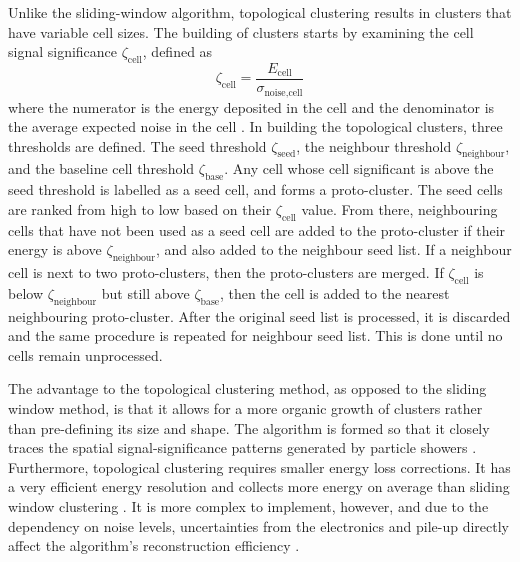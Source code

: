 Unlike the sliding-window algorithm, topological clustering results in clusters that have variable cell sizes. The building of clusters starts by examining the cell signal significance $\zeta_{\text{cell}}$, defined as
\begin{equation}
    \zeta_{\text{cell}} = \dfrac{E_{\text{cell}}}{\sigma_{\text{noise,cell}}}
\end{equation}
where the numerator is the energy deposited in the cell and the denominator is the average expected noise in the cell \cite{Aad_2017_topo_clustering}. In building the topological clusters, three thresholds are defined. The seed threshold $\zeta_{\text{seed}}$, the neighbour threshold $\zeta_{\text{neighbour}}$, and the baseline cell threshold $\zeta_{\text{base}}$. Any cell whose cell significant is above the seed threshold is labelled as a seed cell, and forms a proto-cluster. The seed cells are ranked from high to low based on their $\zeta_{\text{cell}}$ value. From there, neighbouring cells that have not been used as a seed cell are added to the proto-cluster if their energy is above $\zeta_{\text{neighbour}}$, and also added to the neighbour seed list. If a neighbour cell is next to two proto-clusters, then the proto-clusters are merged. If $\zeta_{\text{cell}}$ is below $\zeta_{\text{neighbour}}$ but still above $\zeta_{\text{base}}$, then the cell is added to the nearest neighbouring proto-cluster. After the original seed list is processed, it is discarded and the same procedure is repeated for neighbour seed list. This is done until no cells remain unprocessed. 

The advantage to the topological clustering method, as opposed to the sliding window method, is that it allows for a more organic growth of clusters rather than pre-defining its size and shape. The algorithm is formed so that it closely traces the spatial signal-significance
patterns generated by particle showers \cite{ATL-PHYS-PUB-2017-022}. Furthermore, topological clustering requires smaller energy loss corrections. It has a very efficient energy resolution and collects more energy on average than sliding window clustering \cite{ATL-PHYS-PUB-2017-022}. It is more complex to implement, however, and due to the dependency on noise levels, uncertainties from the electronics and pile-up directly affect the algorithm's reconstruction efficiency \cite{Lampl:1099735}. 

